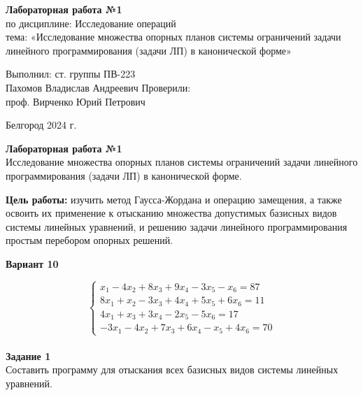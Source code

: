\documentclass[a4paper,14pt]{extarticle}
\newcommand\textbox[1]{
	\parbox{.45\textwidth}{#1}
}
\begin{document}
\vfill
\begin{center}
    \large{
        \textbf{
            Лабораторная работа №1}}\\
    \normalsize{
        по дисциплине: Исследование операций \\
        тема: «Исследование множества опорных планов системы ограничений
        задачи линейного программирования (задачи ЛП) в канонической форме»}
\end{center}
\vfill
\hfill\textbox{
    Выполнил: ст. группы ПВ-223\\Пахомов Владислав Андреевич
    \bigbreak
    Проверили: \\проф. Вирченко Юрий Петрович
}
\vfill\begin{center}
    Белгород 2024 г.
\end{center}
\newpage
\begin{center}
    \textbf{Лабораторная работа №1}\\
    Исследование множества опорных планов системы ограничений
    задачи линейного программирования (задачи ЛП) в канонической форме.\\
\end{center}
\textbf{Цель работы: }изучить метод Гаусса-Жордана и операцию
замещения, а также освоить их применение к отысканию множества
допустимых базисных видов системы линейных уравнений, и решению
задачи линейного программирования простым перебором опорных
решений.\\
\begin{center}
    \textbf{Вариант 10}
\end{center}
\begin{equation*}
    \begin{cases}
        x_1 - 4x_2 + 8x_3 + 9x_4 - 3x_5 - x_6 = 87  \\
        8x_1 + x_2 - 3x_3 + 4x_4 + 5x_5 + 6x_6 = 11 \\
        4x_1 + x_3 + 3x_4 - 2x_5 - 5x_6 = 17        \\
        -3x_1 - 4x_2 + 7x_3 + 6x_4 - x_5 + 4x_6 = 70
    \end{cases}
\end{equation*}\\
\textbf{Задание 1}\\
Составить программу для отыскания всех базисных видов системы
линейных уравнений.\bigbreak
\end{document}
